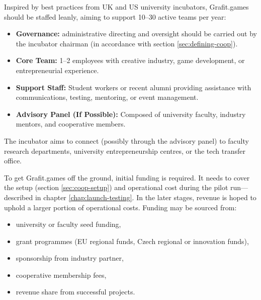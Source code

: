 Inspired by best practices from UK and US university incubators\cite{isis-innovation}, Grafit.games should be staffed leanly, aiming to support 10–30 active teams per year:
\begin{itemize}
    \item \textbf{Governance:} administrative directing and oversight should be carried out by the incubator chairman (in accordance with section \ref{sec:defining-coop}).
    \item \textbf{Core Team:} 1--2 employees with creative industry, game development, or entrepreneurial experience.
    \item \textbf{Support Staff:} Student workers or recent alumni providing assistance with communications, testing, mentoring, or event management.
    \item \textbf{Advisory Panel (If Possible):} Composed of university faculty, industry mentors, and cooperative members.
\end{itemize}
The incubator aims to connect (possibly through the advisory panel) to faculty research departments, university entrepreneurship centres, or the tech transfer office.

To get Grafit.games off the ground, initial funding is required\cite{strategy-incubation}. It needs to cover the setup (section \ref{sec:coop-setup}) and operational cost during the pilot run---described in chapter \ref{chap:launch-testing}. In the later stages, revenue is hoped to uphold a larger portion of operational costs. Funding may be sourced from:
\begin{itemize}
    \item university or faculty seed funding,
    \item grant programmes (EU regional funds, Czech regional or innovation funds),
    \item sponsorship from industry partner,
    \item cooperative membership fees,
    \item revenue share from successful projects.
\end{itemize}

